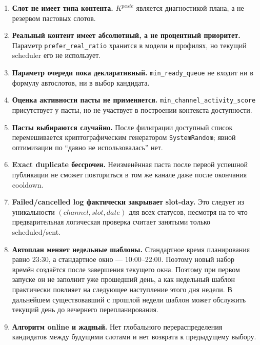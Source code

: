 \documentclass[12pt,a4paper]{article}
\newcommand{\Field}[1]{\texttt{#1}}
\begin{document}
\begin{enumerate}
  \item \textbf{Слот не имеет типа контента.}
        $K^{paste}$ является диагностикой плана, а не резервом пастовых слотов.

  \item \textbf{Реальный контент имеет абсолютный, а не процентный приоритет.}
        Параметр \Field{prefer\_real\_ratio} хранится в модели и профилях, но
        текущий scheduler его не использует.

  \item \textbf{Параметр очереди пока декларативный.}
        \Field{min\_ready\_queue} не входит ни в формулу автослотов, ни в выбор
        кандидата.

  \item \textbf{Оценка активности пасты не применяется.}
        \Field{min\_channel\_activity\_score} присутствует у пасты, но не участвует
        в построении контекста доступности.

  \item \textbf{Пасты выбираются случайно.}
        После фильтрации доступный список перемешивается криптографическим
        генератором \texttt{SystemRandom}; явной оптимизации по ``давно не
        использовалась'' нет.

  \item \textbf{Exact duplicate бессрочен.}
        Неизменённая паста после первой успешной публикации не сможет повториться
        в том же канале даже после окончания cooldown.

  \item \textbf{Failed/cancelled log фактически закрывает slot-day.}
        Это следует из уникальности $(channel,slot,date)$ для всех статусов,
        несмотря на то что предварительная логическая проверка считает занятыми
        только scheduled/sent.

  \item \textbf{Автоплан меняет недельные шаблоны.}
        Стандартное время планирования равно 23{:}30, а стандартное окно ---
        10{:}00--22{:}00. Поэтому новый набор времён создаётся после завершения текущего
        окна. Поэтому при первом запуске он не заполнит уже прошедший день, а как
        недельный шаблон практически повлияет на следующее наступление этого дня
        недели. В дальнейшем существовавший с прошлой недели шаблон может
        обслужить текущий день до вечернего перепланирования.

  \item \textbf{Алгоритм online и жадный.}
        Нет глобального перераспределения кандидатов между будущими слотами и нет
        возврата к предыдущему выбору.
\end{enumerate}
\end{document}
